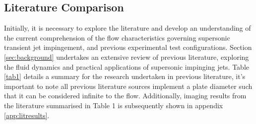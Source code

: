 \subsection{Literature Comparison}
Initially, it is necessary to explore the literature and develop an understanding of the current comprehension of the flow characteristics governing supersonic transient jet impingement, and previous experimental test configurations. Section \ref{sec:background} undertakes an extensive review of previous literature, exploring the fluid dynamics and practical applications of supersonic impinging jets. Table \ref{tab1} details a summary for the research undertaken in previous literature, it's important to note all previous literature sources implement a plate diameter such that it can be considered infinite to the flow. Additionally, imaging results from the literature summarised in Table 1 is subsequently shown in appendix \ref{app:litresults}.


